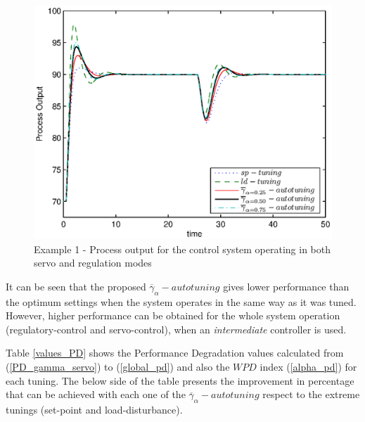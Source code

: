 \begin{figure}[htb!]
    \begin{center}
        \includegraphics[width=0.8\linewidth]{youtp0.eps}
        \caption{Example 1 - Process output for the control system operating in both servo and regulation modes}
        \label{y_out}
    \end{center}
\end{figure}

It can be seen that the proposed
$\overline{\gamma}_{\alpha}-autotuning$ gives lower performance
than the optimum settings when the system operates in the same way
as it was tuned. However, higher performance can be obtained for
the whole system operation (regulatory-control and servo-control),
when an \emph{intermediate} controller is used.

Table \ref{values_PD} shows the Performance Degradation values
calculated from (\ref{PD_gamma_servo}) to (\ref{global_pd}) and
also the $\mathit{WPD}$ index (\ref{alpha_pd}) for each tuning.
The below side of the table presents the improvement in percentage
that can be achieved with each one of the
$\overline{\gamma}_{\alpha}-autotuning$ respect to the extreme
tunings (set-point and load-disturbance).

